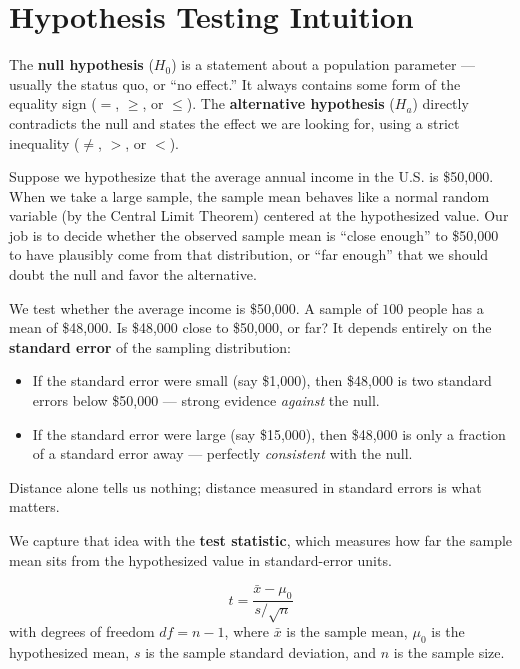 \documentclass[
  11pt,
  letterpaper,
  DIV=11,
  numbers=noendperiod,
  oneside,
  open=any]{scrreprt}
\providecommand{\tightlist}{%
  \setlength{\itemsep}{0pt}\setlength{\parskip}{0pt}}\usepackage{longtable,booktabs,array}
\begin{document}
\section{Hypothesis Testing
Intuition}\label{hypothesis-testing-intuition}

The \textbf{null hypothesis} (\(H_0\)) is a statement about a population
parameter --- usually the status quo, or ``no effect.'' It always
contains some form of the equality sign (\(=\), \(\geq\), or \(\leq\)).
The \textbf{alternative hypothesis} (\(H_a\)) directly contradicts the
null and states the effect we are looking for, using a strict inequality
(\(\ne\), \(>\), or \(<\)).

Suppose we hypothesize that the average annual income in the U.S. is
\$50,000. When we take a large sample, the sample mean behaves like a
normal random variable (by the Central Limit Theorem) centered at the
hypothesized value. Our job is to decide whether the observed sample
mean is ``close enough'' to \$50,000 to have plausibly come from that
distribution, or ``far enough'' that we should doubt the null and favor
the alternative.

\begin{bsexample}[Example]

We test whether the average income is \$50,000. A sample of \(100\)
people has a mean of \$48,000. Is \$48,000 close to \$50,000, or far? It
depends entirely on the \textbf{standard error} of the sampling
distribution:

\begin{itemize}
\tightlist
\item
  If the standard error were small (say \$1,000), then \$48,000 is two
  standard errors below \$50,000 --- strong evidence \emph{against} the
  null.
\item
  If the standard error were large (say \$15,000), then \$48,000 is only
  a fraction of a standard error away --- perfectly \emph{consistent}
  with the null.
\end{itemize}

Distance alone tells us nothing; distance measured in standard errors is
what matters.

\end{bsexample}

We capture that idea with the \textbf{test statistic}, which measures
how far the sample mean sits from the hypothesized value in
standard-error units.

\begin{bsformula}

\[t = \frac{\bar{x} - \mu_0}{s / \sqrt{n}}\] with degrees of freedom
\(df = n - 1\), where \(\bar{x}\) is the sample mean, \(\mu_0\) is the
hypothesized mean, \(s\) is the sample standard deviation, and \(n\) is
the sample size.

\end{bsformula}
\end{document}
